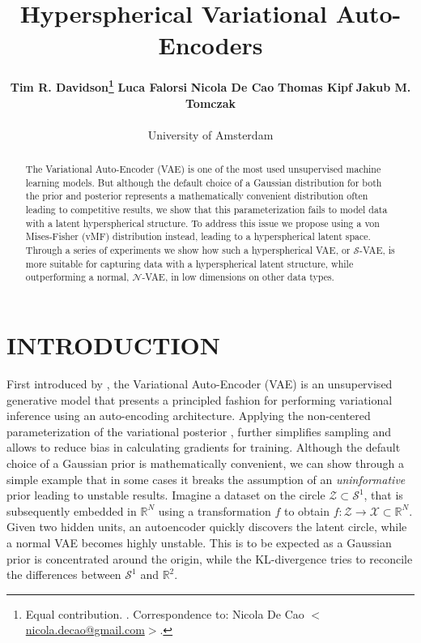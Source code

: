 \documentclass[letterpaper]{article}
\title{Hyperspherical Variational Auto-Encoders}
\author{ {\bf Tim R. Davidson\thanks{\;\;Equal contribution. . Correspondence to: Nicola De Cao $<$\href{mailto:nicola.decao@gmail.com}{nicola.decao@gmail.com}$>$.}}
\quad
{\bf Luca Falorsi\footnotemark[1]}
\quad
{\bf Nicola De Cao\footnotemark[1]}
\quad
{\bf Thomas Kipf}
\quad
{\bf Jakub M. Tomczak}\\\\
University of Amsterdam
}
\begin{document}
\maketitle

\begin{abstract}
The Variational Auto-Encoder (VAE) is one of the most used unsupervised machine learning models. But although the default choice of a Gaussian distribution for both the prior and posterior represents a mathematically convenient distribution often leading to competitive results, we show that this parameterization fails to model data with a latent hyperspherical structure. To address this issue we propose using a von Mises-Fisher (vMF) distribution instead, leading to a hyperspherical latent space. Through a series of experiments we show how such a hyperspherical VAE, or  $\mathcal{S}$-VAE, is more suitable for capturing data with a hyperspherical latent structure, while outperforming a normal,  $\mathcal{N}$-VAE, in low dimensions on other data types.
\end{abstract}

\section{INTRODUCTION}

First introduced by \cite{journals/corr/KingmaW13, rezende2014stochastic}, the Variational Auto-Encoder (VAE) is an unsupervised generative model that presents a principled fashion for performing variational inference using an auto-encoding architecture. Applying the non-centered parameterization of the variational posterior \citep{KingmaWelling-2014-eff-gradient-inf}, further simplifies sampling and allows to reduce bias in calculating gradients for training. Although the default choice of a Gaussian prior is mathematically convenient, we can show through a simple example that in some cases it breaks the assumption of an \textit{uninformative} prior leading to unstable results. Imagine a dataset on the circle $\mathcal{Z} \subset \mathcal{S}^1$, that is subsequently embedded in $\mathbb{R}^N$ using a transformation $f$ to obtain $f: \mathcal{Z} \to \mathcal{X} \subset \mathbb{R}^N$. Given two hidden units, an autoencoder quickly discovers the latent circle, while a normal VAE becomes highly unstable. This is to be expected as a Gaussian prior is concentrated around the origin, while the KL-divergence tries to reconcile the differences between $\mathcal{S}^1$ and $\mathbb{R}^2$. 
\end{document}
